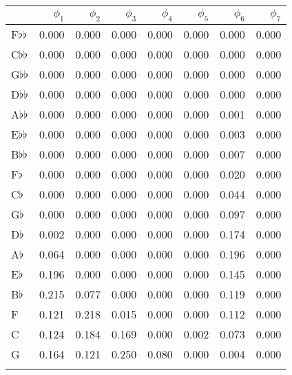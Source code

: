 \begin{tabular}{lrrrrrrr}
\toprule
{} &  $\phi_1$ &  $\phi_2$ &  $\phi_3$ &  $\phi_4$ &  $\phi_5$ &  $\phi_6$ &  $\phi_7$ \\
\midrule
F$\flat$$\flat$   &     0.000 &     0.000 &     0.000 &     0.000 &     0.000 &     0.000 &     0.000 \\
C$\flat$$\flat$   &     0.000 &     0.000 &     0.000 &     0.000 &     0.000 &     0.000 &     0.000 \\
G$\flat$$\flat$   &     0.000 &     0.000 &     0.000 &     0.000 &     0.000 &     0.000 &     0.000 \\
D$\flat$$\flat$   &     0.000 &     0.000 &     0.000 &     0.000 &     0.000 &     0.000 &     0.000 \\
A$\flat$$\flat$   &     0.000 &     0.000 &     0.000 &     0.000 &     0.000 &     0.001 &     0.000 \\
E$\flat$$\flat$   &     0.000 &     0.000 &     0.000 &     0.000 &     0.000 &     0.003 &     0.000 \\
B$\flat$$\flat$   &     0.000 &     0.000 &     0.000 &     0.000 &     0.000 &     0.007 &     0.000 \\
F$\flat$          &     0.000 &     0.000 &     0.000 &     0.000 &     0.000 &     0.020 &     0.000 \\
C$\flat$          &     0.000 &     0.000 &     0.000 &     0.000 &     0.000 &     0.044 &     0.000 \\
G$\flat$          &     0.000 &     0.000 &     0.000 &     0.000 &     0.000 &     0.097 &     0.000 \\
D$\flat$          &     0.002 &     0.000 &     0.000 &     0.000 &     0.000 &     0.174 &     0.000 \\
A$\flat$          &     0.064 &     0.000 &     0.000 &     0.000 &     0.000 &     0.196 &     0.000 \\
E$\flat$          &     0.196 &     0.000 &     0.000 &     0.000 &     0.000 &     0.145 &     0.000 \\
B$\flat$          &     0.215 &     0.077 &     0.000 &     0.000 &     0.000 &     0.119 &     0.000 \\
F                 &     0.121 &     0.218 &     0.015 &     0.000 &     0.000 &     0.112 &     0.000 \\
C                 &     0.124 &     0.184 &     0.169 &     0.000 &     0.002 &     0.073 &     0.000 \\
G                 &     0.164 &     0.121 &     0.250 &     0.080 &     0.000 &     0.004 &     0.000 \\
$$
\end{tabular}

